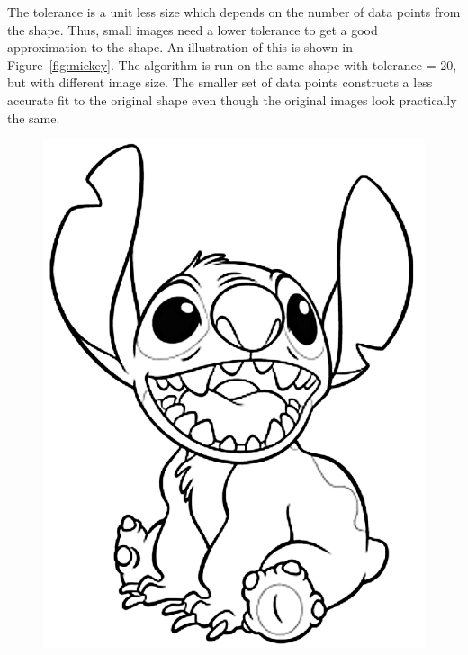 \documentclass[10pt]{article}
\begin{document}
The tolerance is a unit less size which depends on the number of data points from the shape. Thus, small images need a lower tolerance to get a good approximation to the shape.  An illustration of this is shown in Figure~\ref{fig:mickey}. The algorithm is run on the same shape with tolerance = 20, but with different image size. The smaller set of data points constructs a less accurate fit to the original shape even though the original images look practically the same. 





\begin{figure}

\centering
\begin{minipage}[t]{.49\textwidth}
\centering
\vspace{0pt}
    \includegraphics[scale=0.3]{disney.jpg}
    \label{fig:cornerdet}
\end{minipage}
\begin{minipage}[t]{.5\textwidth}

\end{minipage}
\end{figure}
\end{document}
